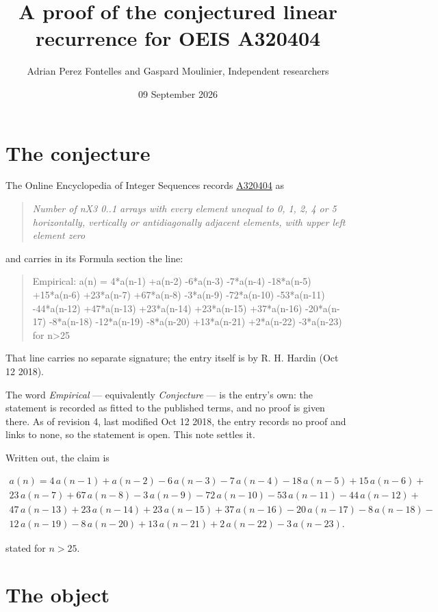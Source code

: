 \documentclass[11pt]{article}
\title{A proof of the conjectured linear recurrence for OEIS A320404}
\author{Adrian Perez Fontelles and Gaspard Moulinier, Independent researchers}
\date{09 September 2026}
\theoremstyle{definition}
\begin{document}
\maketitle
\section{The conjecture}

The Online Encyclopedia of Integer Sequences records \href{https://oeis.org/A320404}{A320404} as

\begin{quote}\itshape Number of nX3 0..1 arrays with every element unequal to 0, 1, 2, 4 or 5 horizontally, vertically or antidiagonally adjacent elements, with upper left element zero\end{quote}

and carries in its Formula section the line:

\begin{quote}\ttfamily Empirical: a(n) = 4*a(n-1) +a(n-2) -6*a(n-3) -7*a(n-4) -18*a(n-5) +15*a(n-6) +23*a(n-7) +67*a(n-8) -3*a(n-9) -72*a(n-10) -53*a(n-11) -44*a(n-12) +47*a(n-13) +23*a(n-14) +23*a(n-15) +37*a(n-16) -20*a(n-17) -8*a(n-18) -12*a(n-19) -8*a(n-20) +13*a(n-21) +2*a(n-22) -3*a(n-23) for n>25\end{quote}

That line carries no separate signature; the entry itself is by R. H. Hardin (Oct 12 2018).

The word {\itshape Empirical} --- equivalently {\itshape Conjecture} --- is the entry's own: the statement is recorded as fitted to the published terms, and no proof is given there. As of revision 4, last modified Oct 12 2018, the entry records no proof and links to none, so the statement is open. This note settles it.

Written out, the claim is

\begin{multline*} a(n) = 4\,a(n-1) + a(n-2) - 6\,a(n-3) - 7\,a(n-4) - 18\,a(n-5) + 15\,a(n-6) + \\ 23\,a(n-7) + 67\,a(n-8) - 3\,a(n-9) - 72\,a(n-10) - 53\,a(n-11) - 44\,a(n-12) + \\ 47\,a(n-13) + 23\,a(n-14) + 23\,a(n-15) + 37\,a(n-16) - 20\,a(n-17) - 8\,a(n-18) - \\ 12\,a(n-19) - 8\,a(n-20) + 13\,a(n-21) + 2\,a(n-22) - 3\,a(n-23). \end{multline*}

stated for $n > 25$.

\section{The object}
\end{document}
